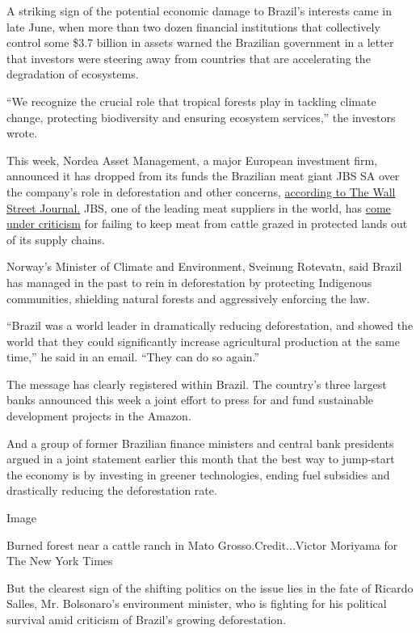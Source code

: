 A striking sign of the potential economic damage to Brazil's interests
came in late June, when more than two dozen financial institutions that
collectively control some \$3.7 billion in assets warned the Brazilian
government in a letter that investors were steering away from countries
that are accelerating the degradation of ecosystems.

``We recognize the crucial role that tropical forests play in tackling
climate change, protecting biodiversity and ensuring ecosystem
services,'' the investors wrote.

This week, Nordea Asset Management, a major European investment firm,
announced it has dropped from its funds the Brazilian meat giant JBS SA
over the company's role in deforestation and other concerns,
\href{https://www.wsj.com/articles/nordea-asset-management-drops-jbs-over-deforestation-corruption-worker-health-11595963107}{according
to The Wall Street Journal.} JBS, one of the leading meat suppliers in
the world, has
\href{https://www.nytimes.com/2019/10/10/world/americas/amazon-fires-brazil-cattle.html}{come
under criticism} for failing to keep meat from cattle grazed in
protected lands out of its supply chains.

Norway's Minister of Climate and Environment, Sveinung Rotevatn, said
Brazil has managed in the past to rein in deforestation by protecting
Indigenous communities, shielding natural forests and aggressively
enforcing the law.

``Brazil was a world leader in dramatically reducing deforestation, and
showed the world that they could significantly increase agricultural
production at the same time,'' he said in an email. ``They can do so
again.''

The message has clearly registered within Brazil. The country's three
largest banks announced this week a joint effort to press for and fund
sustainable development projects in the Amazon.

And a group of former Brazilian finance ministers and central bank
presidents argued in a joint statement earlier this month that the best
way to jump-start the economy is by investing in greener technologies,
ending fuel subsidies and drastically reducing the deforestation rate.

Image

Burned forest near a cattle ranch in Mato Grosso.Credit...Victor
Moriyama for The New York Times

But the clearest sign of the shifting politics on the issue lies in the
fate of Ricardo Salles, Mr. Bolsonaro's environment minister, who is
fighting for his political survival amid criticism of Brazil's growing
deforestation.

